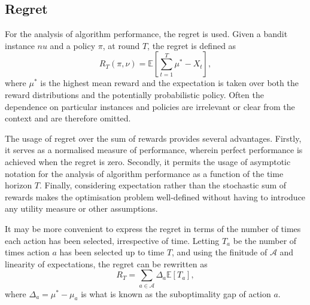 \subsection{Regret}
For the analysis of algorithm performance, the regret is used.
Given a bandit instance $nu$ and a policy $\pi$, at round $T$, the regret is defined as
\begin{equation}
    R_T(\pi, \nu) = \mathbb{E}\left[\sum_{t=1}^T \mu^* - X_t\right],
    \label{eq:regret1}
\end{equation}
where $\mu^*$ is the highest mean reward and the expectation is taken over both the reward distributions and the potentially probabilistic policy.
Often the dependence on particular instances and policies are irrelevant or clear from the context and are therefore omitted.

The usage of regret over the sum of rewards provides several advantages.
Firstly, it serves as a normalised measure of performance, wherein perfect performance is achieved when the regret is zero.
Secondly, it permits the usage of asymptotic notation for the analysis of algorithm performance as a function of the time horizon $T$.
Finally, considering expectation rather than the stochastic sum of rewards makes the optimisation problem well-defined without having to introduce any utility measure or other assumptions.

It may be more convenient to express the regret in terms of the number of times each action has been selected, irrespective of time.
Letting $T_a$ be the number of times action $a$ has been selected up to time $T$, and using the finitude of $\mathcal{A}$ and linearity of expectations, the regret can be rewritten as
\begin{equation}
    R_T = \sum_{a \in \mathcal{A}} \Delta_a  \mathbb{E}[T_a],
    \label{eq:regret2}
\end{equation}
where $\Delta_a = \mu^* - \mu_a$ is what is known as the suboptimality gap of action $a$.
